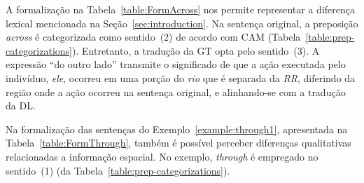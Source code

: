 \documentclass[a4paper, twocolumn, 11pt, twoside]{article}
\begin{document}
A formalização na Tabela~\ref{table:FormAcross} nos permite representar a diferença lexical mencionada na Seção~\ref{sec:introduction}. 
Na sentença original, a preposição \textit{across} é categorizada como sentido~(2) de acordo com CAM (Tabela~\ref{table:prep-categorizations}). 
Entretanto, a tradução da GT opta pelo sentido~(3). A expressão ``do outro lado'' transmite o significado de 
que a ação executada pelo indivíduo, \textit{ele}, ocorreu em uma porção do \textit{rio} que é separada da \textit{RR}, 
diferindo da região onde a ação ocorreu na sentença original, e alinhando-se com a tradução da DL.

Na formalização das sentenças do Exemplo~\ref{example:through1}, apresentada na Tabela~\ref{table:FormThrough},
também é possível perceber diferenças qualitativas relacionadas a informação espacial. No exemplo, \textit{through} é empregado no sentido~(1) (da Tabela~\ref{table:prep-categorizations}).
\end{document}
